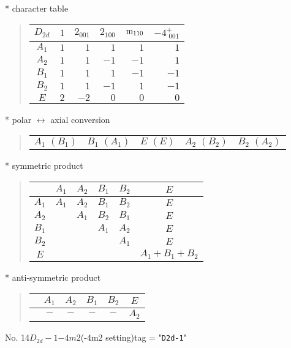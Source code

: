 \documentclass[fleqn,10pt,landscape]{jsarticle}
\begin{document}
* character table
\begin{quote}
\begin{tabular}{crrrrr} \hline \hline
$ D_{2d} $ & $ 1 $ & $ 2{}_{001} $ & $ 2{}_{100} $ & $ {\rm m}_{110} $ & $ -4^{+}_{\,\,001} $ \\ \hline
$ A_{1} $ & $ 1 $ & $ 1 $ & $ 1 $ & $ 1 $ & $ 1 $ \\
$ A_{2} $ & $ 1 $ & $ 1 $ & $ -1 $ & $ -1 $ & $ 1 $ \\
$ B_{1} $ & $ 1 $ & $ 1 $ & $ 1 $ & $ -1 $ & $ -1 $ \\
$ B_{2} $ & $ 1 $ & $ 1 $ & $ -1 $ & $ 1 $ & $ -1 $ \\
$ E $ & $ 2 $ & $ -2 $ & $ 0 $ & $ 0 $ & $ 0 $ \\
 \hline \hline
\end{tabular}
\end{quote}
* polar $\leftrightarrow$ axial conversion
\begin{quote}
\begin{tabular}{ccccc}
$ A_{1}\,\,(B_{1}) $ & $ B_{1}\,\,(A_{1}) $ & $ E\,\,(E) $ & $ A_{2}\,\,(B_{2}) $ & $ B_{2}\,\,(A_{2}) $
\end{tabular}
\end{quote}
* symmetric product
\begin{quote}
\begin{tabular}{c|ccccc} \hline \hline
 & $ A_{1} $ & $ A_{2} $ & $ B_{1} $ & $ B_{2} $ & $ E $ \\ \hline
$ A_{1} $ & $ A_{1} $ & $ A_{2} $ & $ B_{1} $ & $ B_{2} $ & $ E $ \\
$ A_{2} $ & $  $ & $ A_{1} $ & $ B_{2} $ & $ B_{1} $ & $ E $ \\
$ B_{1} $ & $  $ & $  $ & $ A_{1} $ & $ A_{2} $ & $ E $ \\
$ B_{2} $ & $  $ & $  $ & $  $ & $ A_{1} $ & $ E $ \\
$ E $ & $  $ & $  $ & $  $ & $  $ & $ A_{1} + B_{1} + B_{2} $ \\
 \hline \hline
\end{tabular}
\end{quote}
* anti-symmetric product
\begin{quote}
\begin{tabular}{cccccc} \hline \hline
 & $ A_{1} $ & $ A_{2} $ & $ B_{1} $ & $ B_{2} $ & $ E $ \\ \hline
$  $ & $ - $ & $ - $ & $ - $ & $ - $ & $ A_{2} $ \\
 \hline \hline
\end{tabular}
\end{quote}
\newpage
No. 14\quad$D_{2d}-1$\quad$-4m2$\quad(-4m2 setting)\quad[ tetragonal ]
tag = "{\tt D2d-1}"
\end{document}
